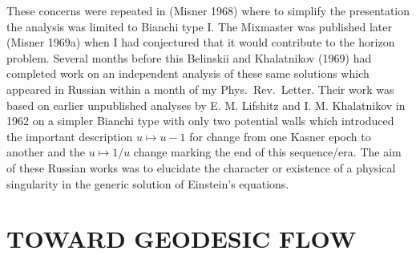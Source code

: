 These concerns were repeated in (Misner 1968) where to simplify the
presentation the analysis was limited to Bianchi type I.  The
Mixmaster was published later (Misner 1969a) when I had conjectured
that it would contribute to the horizon problem.  Several months
before this Belinskii and Khalatnikov (1969) had completed work on an
independent analysis of these same solutions which appeared in
Russian within a month of my Phys.\ Rev.\ Letter.  Their work was
based on earlier unpublished analyses by E. M. Lifshitz and I. M.
Khalatnikov in 1962 on a simpler Bianchi type with only two potential
walls which introduced the important description $u \mapsto u-1$ for
change from one Kasner epoch to another and the $u \mapsto 1/u$
change marking the end of this sequence/era.  The aim of these Russian
works was to elucidate the character or existence of a physical
singularity in the generic solution of Einstein's equations.



\section{TOWARD GEODESIC FLOW}

